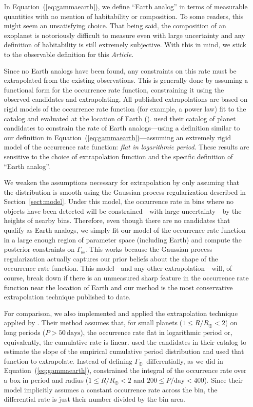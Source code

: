 \documentclass[12pt,preprint]{aastex}
\newcommand{\paper}{\textsl{Article}}
\newcommand{\Eq}[1]{Equation~(\ref{eq:#1})}
\newcommand{\eq}[1]{\Eq{#1}}
\newcommand{\Sect}[1]{Section~\ref{sect:#1}}
\newcommand{\sect}[1]{\Sect{#1}}
\newcommand{\rate}{\ensuremath{\Gamma}}
\newcommand{\radius}{\ensuremath{R}}
\newcommand{\period}{\ensuremath{P}}
\newcommand{\gammaearth}{{\ensuremath{\rate_\oplus}}}
\begin{document}
In \eq{gammaearth}, we define ``Earth analog'' in terms of measurable
quantities with no mention of habitability or composition.
To some readers, this might seem an unsatisfying choice.
That being said, the composition of an exoplanet is notoriously difficult to
measure even with large uncertainty and any definition of habitability is
still extremely subjective.
With this in mind, we stick to the observable definition for this \paper.

Since no Earth analogs have been found, any constraints on this rate must be
extrapolated from the existing observations.
This is generally done by assuming a functional form for the occurrence rate
function, constraining it using the observed candidates and extrapolating.
All published extrapolations are based on rigid models of the occurrence rate
function (for example, a power law) fit to the catalog and evaluated at the
location of Earth (\citealt{catanzarite, traub}).
\citet{petigura} used their catalog of planet candidates to constrain the rate
of Earth analogs---using a definition similar to our definition in
\eq{gammaearth}---assuming an extremely rigid model of the occurrence rate
function: \emph{flat in logarithmic period}.
These results are sensitive to the choice of extrapolation function and the
specific definition of ``Earth analog''.

We weaken the assumptions necessary for extrapolation by only assuming that
the distribution is smooth using the Gaussian process regularization described
in \sect{model}.
Under this model, the occurrence rate in bins where no objects have been
detected will be constrained---with large uncertainty---by the heights of
nearby bins.
Therefore, even though there are no candidates that qualify as Earth analogs,
we simply fit our model of the occurrence rate function in a large enough
region of parameter space (including Earth) and compute the posterior
constraints on \gammaearth.
This works because the Gaussian process regularization actually captures our
prior beliefs about the shape of the occurrence rate function.
This model---and any other extrapolation---will, of course, break down if
there is an unmeasured sharp feature in the occurrence rate function near the
location of Earth and our method is the most conservative extrapolation
technique published to date.

For comparison, we also implemented and applied the extrapolation technique
applied by \citet{petigura}.
Their method assumes that, for small planets ($1 \le \radius/\radius_\oplus <
2$) on long periods ($\period > 50\,\mathrm{days}$), the occurrence rate flat
in logarithmic period or, equivalently, the cumulative rate is linear.
\citet{petigura} used the candidates in their catalog to estimate the slope of
the empirical cumulative period distribution and used that function to
extrapolate.
Instead of defining \gammaearth\ differentially, as we did in \eq{gammaearth},
\citet{petigura} constrained the integral of the occurrence rate over a box in
period and radius ($1 \le \radius/\radius_\oplus < 2$ and $200 \le
\period/\mathrm{day} < 400$).
Since their model implicitly assumes a constant occurrence rate across the
bin, the differential rate is just their number divided by the bin area.
\end{document}
